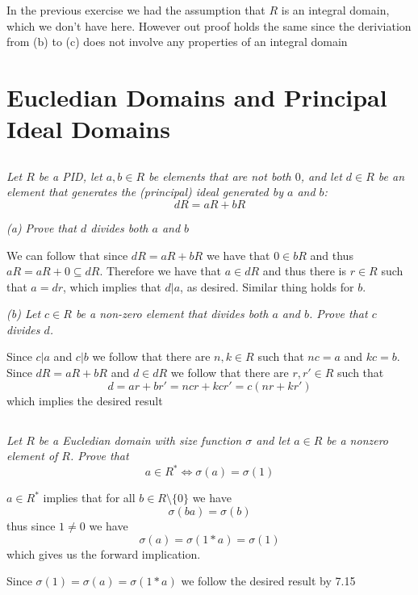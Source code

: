 \documentclass[11pt,oneside,titlepage]{book}
\newcommand{\set}[1]{\{ #1 \}}
\begin{document}
In the previous exercise we had the assumption that $R$ is an integral
domain, which we don't have here. However out proof holds the same
since the deriviation from (b) to (c) does not involve any properties
of an integral domain

\section{Eucledian Domains and Principal Ideal Domains}

\subsection{}

\textit{Let $R$ be a PID, let $a, b \in R$ be elements that are not
  both $0$, and let $d \in R$ be an element that generates the
  (principal) ideal generated by $a$ and $b$:
  $$dR = aR + bR$$}

\textit{(a) Prove that $d$ divides both $a$ and $b$}

We can follow that since $dR = aR + bR$ we have that $0 \in bR$ and
thus $aR = aR + 0 \subseteq dR$. Therefore we have that $a \in dR$ and
thus there is $r \in R$ such that $a = dr$, which implies that $d |
a$, as desired. Similar thing holds for $b$.


\textit{(b) Let $c \in R$ be a non-zero element that divides both $a$
  and $b$. Prove that $c$ divides $d$.}

Since $c \vert a$ and $c \vert b$ we follow that there are $n, k \in R$
such that $nc = a$ and $kc = b$. Since $dR = aR + bR$ and $d \in dR$
we follow that there are $r, r' \in R$ such that
$$d = ar + br' = ncr + kcr' = c(nr + kr')$$
which implies the desired result

\subsection{}

\textit{Let $R$ be a Eucledian domain with size function $\sigma$ and
  let $a \in R$ be a nonzero element of $R$. Prove that
  $$a \in R^* \iff \sigma(a) = \sigma(1)$$
}

$a \in R^*$ implies that for all $b \in R \setminus \set{0}$ we have
$$\sigma(ba) = \sigma(b)$$
thus since $1 \neq 0$ we have
$$\sigma(a) = \sigma(1 * a) = \sigma(1)$$
which gives us the forward implication.

Since $\sigma(1) = \sigma(a)  = \sigma(1 * a)$
we follow the desired result by 7.15
\end{document}
